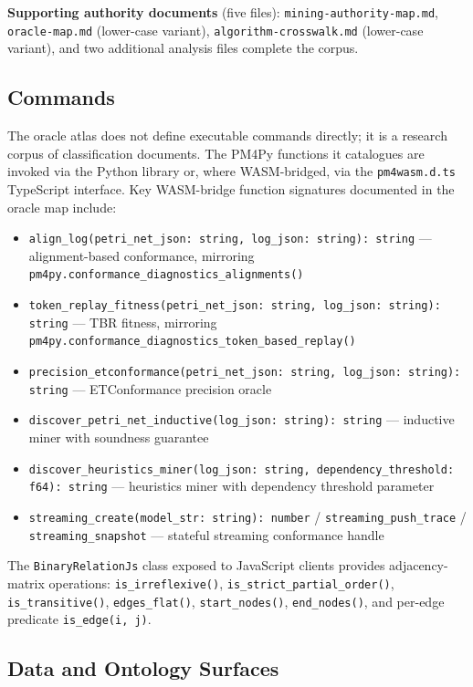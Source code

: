 \textbf{Supporting authority documents} (five files): \texttt{mining-authority-map.md},
\texttt{oracle-map.md} (lower-case variant), \texttt{algorithm-crosswalk.md} (lower-case
variant), and two additional analysis files complete the corpus.

\subsection{Commands}
\label{sec:sources-pm4py-impl-commands}

The oracle atlas does not define executable commands directly; it is a research corpus of
classification documents. The PM4Py functions it catalogues are invoked via the Python
library or, where WASM-bridged, via the \texttt{pm4wasm.d.ts} TypeScript interface. Key
WASM-bridge function signatures documented in the oracle map include:
\begin{itemize}
  \item \texttt{align\_log(petri\_net\_json: string, log\_json: string): string} --- alignment-based conformance, mirroring \texttt{pm4py.conformance\_diagnostics\_alignments()}
  \item \texttt{token\_replay\_fitness(petri\_net\_json: string, log\_json: string): string} --- TBR fitness, mirroring \texttt{pm4py.conformance\_diagnostics\_token\_based\_replay()}
  \item \texttt{precision\_etconformance(petri\_net\_json: string, log\_json: string): string} --- ETConformance precision oracle
  \item \texttt{discover\_petri\_net\_inductive(log\_json: string): string} --- inductive miner with soundness guarantee
  \item \texttt{discover\_heuristics\_miner(log\_json: string, dependency\_threshold: f64): string} --- heuristics miner with dependency threshold parameter
  \item \texttt{streaming\_create(model\_str: string): number} / \texttt{streaming\_push\_trace} / \texttt{streaming\_snapshot} --- stateful streaming conformance handle
\end{itemize}
The \texttt{BinaryRelationJs} class exposed to JavaScript clients provides adjacency-matrix
operations: \texttt{is\_irreflexive()}, \texttt{is\_strict\_partial\_order()},
\texttt{is\_transitive()}, \texttt{edges\_flat()}, \texttt{start\_nodes()},
\texttt{end\_nodes()}, and per-edge predicate \texttt{is\_edge(i, j)}.

\subsection{Data and Ontology Surfaces}
\label{sec:sources-pm4py-impl-data}


